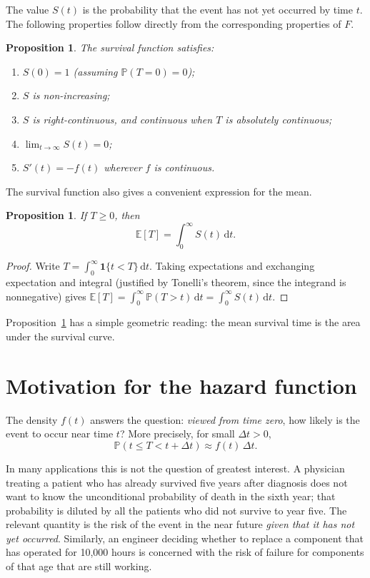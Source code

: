 \documentclass[11pt]{article}
\theoremstyle{definition}
\theoremstyle{plain}
\newtheorem{proposition}[definition]{Proposition}
\newcommand{\Prob}{\mathbb{P}}
\newcommand{\E}{\mathbb{E}}
\newcommand{\dd}{\,\mathrm{d}}
\begin{document}
The value $S(t)$ is the probability that the event has not yet occurred by time $t$. The following properties follow directly from the corresponding properties of $F$.

\begin{proposition}\label{prop:survival-props}
The survival function satisfies:
\begin{enumerate}
  \item $S(0) = 1$ (assuming $\Prob(T = 0) = 0$);
  \item $S$ is non-increasing;
  \item $S$ is right-continuous, and continuous when $T$ is absolutely continuous;
  \item $\lim_{t \to \infty} S(t) = 0$;
  \item $S'(t) = -f(t)$ wherever $f$ is continuous.
\end{enumerate}
\end{proposition}

The survival function also gives a convenient expression for the mean.

\begin{proposition}\label{prop:mean}
If $T \ge 0$, then
\[
  \E[T] = \int_0^\infty S(t) \dd t.
\]
\end{proposition}

\begin{proof}
Write $T = \int_0^\infty \mathbf{1}\{t < T\} \dd t$. Taking expectations and exchanging expectation and integral (justified by Tonelli's theorem, since the integrand is nonnegative) gives $\E[T] = \int_0^\infty \Prob(T > t) \dd t = \int_0^\infty S(t) \dd t$.
\end{proof}

Proposition~\ref{prop:mean} has a simple geometric reading: the mean survival time is the area under the survival curve.

\section{Motivation for the hazard function}\label{sec:motivation}

The density $f(t)$ answers the question: \emph{viewed from time zero}, how likely is the event to occur near time $t$? More precisely, for small $\Delta t > 0$,
\[
  \Prob(t \le T < t + \Delta t) \approx f(t)\,\Delta t.
\]

In many applications this is not the question of greatest interest. A physician treating a patient who has already survived five years after diagnosis does not want to know the unconditional probability of death in the sixth year; that probability is diluted by all the patients who did not survive to year five. The relevant quantity is the risk of the event in the near future \emph{given that it has not yet occurred}. Similarly, an engineer deciding whether to replace a component that has operated for 10{,}000 hours is concerned with the risk of failure for components of that age that are still working.
\end{document}
